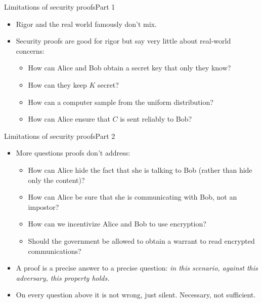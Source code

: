 \ifdefined\PRESENTATION\else\PassOptionsToClass{handout}{beamer}\fi\documentclass[aspectratio=169, lualatex]{beamer}
\begin{document}
\begin{frame}{Limitations of security proofs}{Part 1}
	\begin{itemize}[<+->]
		\item Rigor and the real world famously don't mix.
		\item Security proofs are good for rigor but say very little about real-world concerns:
		      \begin{itemize}[<+->]
			      \item How can Alice and Bob obtain a secret key that only they know?
			      \item How can they keep $K$ secret?
			      \item How can a computer sample from the uniform distribution?
			      \item How can Alice ensure that $C$ is sent reliably to Bob?
		      \end{itemize}
	\end{itemize}
\end{frame}

\begin{frame}{Limitations of security proofs}{Part 2}
	\begin{itemize}[<+->]
		\item More questions proofs don't address:
		      \begin{itemize}[<+->]
			      \item How can Alice hide the fact that she is talking to Bob (rather than hide only the content)?
			      \item How can Alice be sure that she is communicating with Bob, not an impostor?
			      \item How can we incentivize Alice and Bob to use encryption?
			      \item Should the government be allowed to obtain a warrant to read encrypted communications?
		      \end{itemize}
		\item A proof is a precise answer to a precise question: \emph{in this scenario, against this adversary, this property holds.}
		\item On every question above it is not wrong, just silent. Necessary, not sufficient.
	\end{itemize}
\end{frame}
\end{document}
